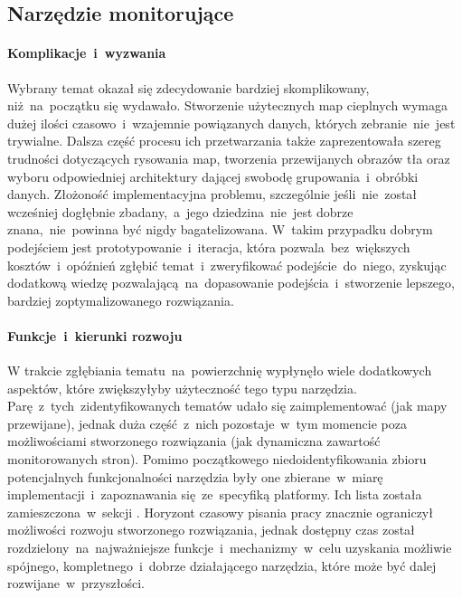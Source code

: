 \subsection{Narzędzie monitorujące}

\paragraph{Komplikacje~i~wyzwania}
Wybrany temat okazał się zdecydowanie bardziej skomplikowany, niż~na~początku się wydawało. Stworzenie użytecznych map cieplnych wymaga dużej ilości czasowo~i~wzajemnie powiązanych danych, których zebranie~nie~jest trywialne. Dalsza część procesu ich przetwarzania także zaprezentowała szereg trudności dotyczących rysowania map, tworzenia przewijanych obrazów tła oraz wyboru odpowiedniej architektury dającej swobodę grupowania~i~obróbki danych. Złożoność implementacyjna problemu, szczególnie jeśli~nie~został wcześniej dogłębnie zbadany,~a~jego dziedzina~nie~jest dobrze znana,~nie~powinna być nigdy bagatelizowana. W~takim przypadku dobrym podejściem jest prototypowanie~i~iteracja, która pozwala~bez~większych kosztów~i~opóźnień zgłębić temat~i~zweryfikować podejście~do~niego, zyskując dodatkową wiedzę pozwalającą~na~dopasowanie podejścia~i~stworzenie lepszego, bardziej zoptymalizowanego rozwiązania.

\paragraph{Funkcje~i~kierunki rozwoju}
W trakcie zgłębiania tematu~na~powierzchnię wypłynęło wiele dodatkowych aspektów, które zwiększyłyby użyteczność tego typu narzędzia. Parę~z~tych~zidentyfikowanych tematów udało się zaimplementować (jak mapy przewijane), jednak duża część~z~nich pozostaje~w~tym momencie poza możliwościami stworzonego rozwiązania (jak dynamiczna zawartość monitorowanych stron). Pomimo początkowego niedoidentyfikowania zbioru potencjalnych funkcjonalności narzędzia były one zbierane~w~miarę implementacji~i~zapoznawania się~ze~specyfiką platformy. Ich lista została zamieszczona~w~sekcji . Horyzont czasowy pisania pracy znacznie ograniczył możliwości rozwoju stworzonego rozwiązania, jednak dostępny czas został rozdzielony~na~najważniejsze funkcje~i~mechanizmy~w~celu uzyskania możliwie spójnego, kompletnego~i~dobrze działającego narzędzia, które może być dalej rozwijane~w~przyszłości.

